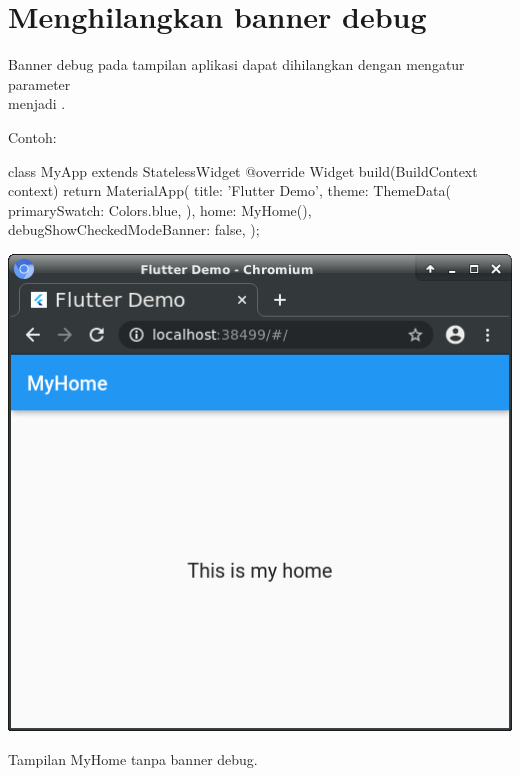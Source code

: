 \section{Menghilangkan banner debug}

Banner debug pada tampilan aplikasi dapat dihilangkan dengan
mengatur parameter \\
 menjadi .

Contoh:
\begin{dartcode}
class MyApp extends StatelessWidget {
  @override
  Widget build(BuildContext context) {
    return MaterialApp(
      title: 'Flutter Demo',
      theme: ThemeData(
        primarySwatch: Colors.blue,
      ),
      home: MyHome(),
      debugShowCheckedModeBanner: false,
    );
  }
}
\end{dartcode}

\begin{marginfigure}
{\centering
\includegraphics[width=\marginparwidth]{images/MyHome_01.png}
\par}
\caption{Tampilan MyHome tanpa banner debug.}
\end{marginfigure}